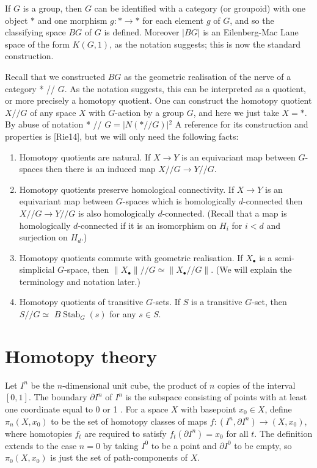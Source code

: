 \documentclass{book}
\begin{document}
If $G$ is a group, then $G$ can be identified with a category (or groupoid) with one object $*$ and one morphism $g: * \rightarrow *$ for each element $g$ of $G$, and so the classifying space $B G$ of $G$ is defined. Moreover $|B G|$ is an Eilenberg-Mac Lane space of the form $K(G, 1)$, as the notation suggests; this is now the standard construction.


Recall that we constructed $B G$ as the geometric realisation of the nerve of a category * // $G$. As the notation suggests, this can be interpreted as a quotient, or more precisely a homotopy quotient. One can construct the homotopy quotient $X / / G$ of any space $X$ with $G$-action by a group $G$, and here we just take $X=*$. By abuse of notation * // $G=|N(* / / G)|{ }^2$ A reference for its construction and properties is [Rie14], but we will only need the following facts:

\begin{enumerate}
    \item Homotopy quotients are natural. If $X \rightarrow Y$ is an equivariant map between $G$-spaces then there is an induced map $X / / G \rightarrow Y / / G$.
    \item Homotopy quotients preserve homological connectivity. If $X \rightarrow Y$ is an equivariant map between $G$-spaces which is homologically $d$-connected then $X / / G \rightarrow Y / / G$ is also homologically $d$-connected. (Recall that a map is homologically $d$-connected if it is an isomorphism on $H_i$ for $i<d$ and surjection on $H_d$.)
    \item Homotopy quotients commute with geometric realisation. If $X_{\bullet}$ is a semi-simplicial $G$-space, then $\left\|X_{\bullet}\right\| / / G \simeq\left\|X_{\bullet} / / G\right\|$. (We will explain the terminology and notation later.)
    \item Homotopy quotients of transitive $G$-sets. If $S$ is a transitive $G$-set, then $S / / G \simeq$ $B \operatorname{Stab}_G(s)$ for any $s \in S$.
\end{enumerate}









\chapter{Homotopy theory}

Let $I^n$ be the $n$-dimensional unit cube, the product of $n$ copies of the interval $[0,1]$. The boundary $\partial I^n$ of $I^n$ is the subspace consisting of points with at least one coordinate equal to 0 or 1 . For a space $X$ with basepoint $x_0 \in X$, define $\pi_n\left(X, x_0\right)$ to be the set of homotopy classes of maps $f:\left(I^n, \partial I^n\right) \rightarrow\left(X, x_0\right)$, where homotopies $f_t$ are required to satisfy $f_t\left(\partial I^n\right)=x_0$ for all $t$. The definition extends to the case $n=0$ by taking $I^0$ to be a point and $\partial I^0$ to be empty, so $\pi_0\left(X, x_0\right)$ is just the set of path-components of $X$.
\end{document}

